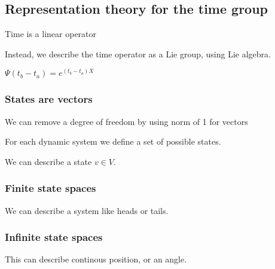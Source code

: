 \subsection{Representation theory for the time group}

Time is a linear operator

Instead, we describe the time operator as a Lie group, using Lie algebra.

\(\Psi (t_b-t_a)=e^{(t_b-t_a)X}\)

\subsubsection{States are vectors}

We can remove a degree of freedom by using norm of 1 for vectors

For each dynamic system we define a set of possible states.

We can describe a state \(v\in V\).

\subsubsection{Finite state spaces}

We can describe a system like heads or tails.

\subsubsection{Infinite state spaces}

This can describe continous position, or an angle.

